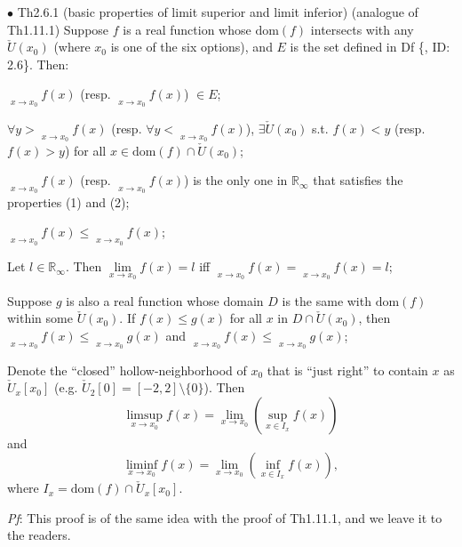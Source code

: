 \documentclass{article}
\begin{document}
\begin{Th}{$\bullet$ Th2.6.1 (basic properties of limit superior and limit inferior) (analogue of Th1.11.1)}
    Suppose $f$ is a real function whose $\text{dom}(f)$ intersects with any $\check{U}(x_0)$ (where $x_0$ is one of the six options), and $E$ is the set defined in Df \{, ID: 2.6\}. Then:
    \begin{compactenum}
        \item $\mathop{\overline{\lim}}\limits_{x\to x_0} f(x)$ (resp. $\mathop{\underline{\lim}}\limits_{x\to x_0} f(x)$) $\in E$;
        \item $\forall y>\mathop{\overline{\lim}}\limits_{x\to x_0} f(x)$ (resp. $\forall y<\mathop{\underline{\lim}}\limits_{x\to x_0} f(x)$), $\exists\check{U}(x_0)$ s.t. $f(x)<y$ (resp. $f(x)>y$) for all $x\in\text{dom}(f)\cap\check{U}(x_0)$;
        \item $\mathop{\overline{\lim}}\limits_{x\to x_0} f(x)$ (resp. $\mathop{\underline{\lim}}\limits_{x\to x_0} f(x)$) is the only one in $\mathbb{R}_\infty$ that satisfies the properties (1) and (2);
        \item $\mathop{\underline{\lim}}\limits_{x\to x_0} f(x)\leq \mathop{\overline{\lim}}\limits_{x\to x_0} f(x)$;
        \item Let $l\in\mathbb{R}_\infty$. Then $\lim\limits_{x\to x_0} f(x) = l$ iff $\mathop{\underline{\lim}}\limits_{x\to x_0} f(x) = \mathop{\overline{\lim}}\limits_{x\to x_0} f(x) = l$;
        \item Suppose $g$ is also a real function whose domain $D$ is the same with $\text{dom}(f)$ within some $\check{U}(x_0)$. If $f(x)\leq g(x)$ for all $x$ in $D\cap\check{U}(x_0)$, then $\mathop{\underline{\lim}}\limits_{x\to x_0} f(x)\leq \mathop{\underline{\lim}}\limits_{x\to x_0} g(x)$ and $\mathop{\overline{\lim}}\limits_{x\to x_0} f(x)\leq \mathop{\overline{\lim}}\limits_{x\to x_0} g(x)$;
        \item Denote the ``closed'' hollow-neighborhood of $x_0$ that is ``just right'' to contain $x$ as $\check{U}_x[x_0]$ (e.g. $\check{U}_2[0] = [-2, 2]\setminus\{0\}$). Then $$\limsup\limits_{x\to x_0} f(x) = \lim\limits_{x\to x_0} \left(\sup\limits_{x\in I_x} f(x)\right)$$
        and 
        $$\liminf\limits_{x\to x_0} f(x) = \lim\limits_{x\to x_0} \left(\inf\limits_{x\in I_x} f(x)\right),$$
        where $I_x = \text{dom}(f)\cap\check{U}_x[x_0]$.
    \end{compactenum}
    \tcblower
    \textit{Pf}: This proof is of the same idea with the proof of Th1.11.1, and we leave it to the readers.
\end{Th}
\end{document}
